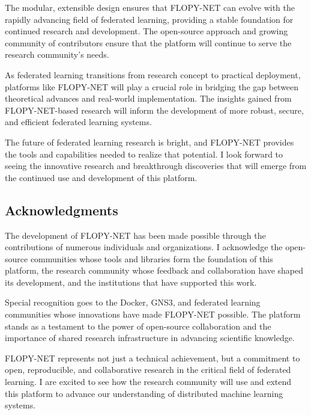 The modular, extensible design ensures that FLOPY-NET can evolve with the rapidly advancing field of federated learning, providing a stable foundation for continued research and development. The open-source approach and growing community of contributors ensure that the platform will continue to serve the research community's needs.

As federated learning transitions from research concept to practical deployment, platforms like FLOPY-NET will play a crucial role in bridging the gap between theoretical advances and real-world implementation. The insights gained from FLOPY-NET-based research will inform the development of more robust, secure, and efficient federated learning systems.

The future of federated learning research is bright, and FLOPY-NET provides the tools and capabilities needed to realize that potential. I look forward to seeing the innovative research and breakthrough discoveries that will emerge from the continued use and development of this platform.

\subsection{Acknowledgments}

The development of FLOPY-NET has been made possible through the contributions of numerous individuals and organizations. I acknowledge the open-source communities whose tools and libraries form the foundation of this platform, the research community whose feedback and collaboration have shaped its development, and the institutions that have supported this work.

Special recognition goes to the Docker, GNS3, and federated learning communities whose innovations have made FLOPY-NET possible. The platform stands as a testament to the power of open-source collaboration and the importance of shared research infrastructure in advancing scientific knowledge.

FLOPY-NET represents not just a technical achievement, but a commitment to open, reproducible, and collaborative research in the critical field of federated learning. I are excited to see how the research community will use and extend this platform to advance our understanding of distributed machine learning systems.
